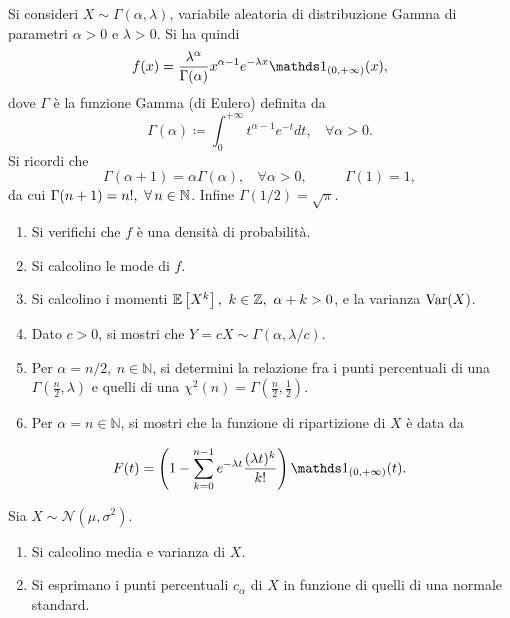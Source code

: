 Si consideri $X\sim \Gamma (\alpha ,\lambda)$, variabile aleatoria di distribuzione Gamma di parametri $\alpha  >0$ e $\lambda  >0$. Si ha quindi
\begin{equation*}
f(x) =\frac{\lambda^{\alpha }}{\Gamma (\alpha)} x^{\alpha -1} e^{-\lambda x} \Ind_{(0,+\infty)}(x) ,
\end{equation*}
dove $\Gamma $ è la funzione Gamma (di Eulero) definita da
\begin{equation*}
\Gamma (\alpha) \coloneqq \int_{0}^{+\infty } t^{\alpha -1} e^{-t} dt,\ \ \ \ \forall \alpha  >0.
\end{equation*}
Si ricordi che
\begin{equation*}
\Gamma (\alpha +1) =\alpha \Gamma (\alpha) ,\ \ \ \ \forall \alpha  >0,\ \ \ \ \ \ \ \ \ \ \ \ \Gamma (1) =1,
\end{equation*}
da cui $\Gamma (n+1) =n!,\ \forall n\in \NN$. Infine $\Gamma (1/2) =\sqrt{\pi }$.
\begin{enumerate}
\item Si verifichi che $f$ è una densità di probabilità.
\item Si calcolino le mode di $f$.
\item Si calcolino i momenti $\mathbb{E}\left[ X^{k}\right] ,\ k\in \mathbb{Z} ,\ \alpha +k >0$, e la varianza $\operatorname{Var}(X)$.
\item Dato $c >0$, si mostri che $Y=cX\sim \Gamma (\alpha ,\lambda /c)$.
\item Per $\alpha =n/2,\ n\in \mathbb{N}$, si determini la relazione fra i punti percentuali di una $\Gamma \left(\frac{n}{2} ,\lambda \right)$ e quelli di una $\chi ^{2}(n) =\Gamma \left(\frac{n}{2} ,\frac{1}{2}\right)$.
\item Per $\alpha =n\in \mathbb{N}$, si mostri che la funzione di ripartizione di $X$ è data da
\end{enumerate}
\begin{equation*}
F(t) =\left(1-\sum\limits_{k=0}^{n-1} e^{-\lambda t}\frac{(\lambda t)^{k}}{k!}\right) \Ind_{(0,+\infty)}(t) .
\end{equation*}

Sia $X\sim \mathcal{N}\left(\mu ,\sigma^{2}\right)$.
\begin{enumerate}
\item Si calcolino media e varianza di $X$.
\item Si esprimano i punti percentuali $c_{\alpha }$ di $X$ in funzione di quelli di una normale standard.
\end{enumerate}

